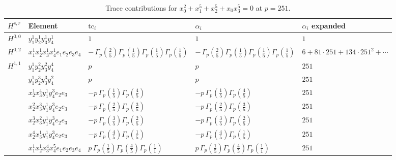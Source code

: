 \documentclass[11pt]{article}
\begin{document}
\begin{table}[ht]
\centering
\caption{Trace contributions for $x_0^{2} + x_1^{5} + x_2^{5} + x_0 x_3^{5} = 0$ at $p=251$.}\label{tab:deformed-19}
\renewcommand{\arraystretch}{1.1}
{\scriptsize
\begin{tabular}{@{}lllll@{}}
\toprule
$H^{s,r}$ & Element & $\mathrm{tc}_i$ & $\alpha_i$ & $\alpha_i$ expanded \\
\midrule
$H^{0,0}$ & $y_{1}^{1} y_{2}^{1} y_{3}^{1} y_{4}^{1}$ & $1$ & $1$ & $1$ \\
\midrule
$H^{0,2}$ & $x_{1}^{1} x_{2}^{1} x_{3}^{1} x_{4}^{1}  e_{1} e_{2} e_{3} e_{4}$ & $- \, \Gamma_p \left( \frac{2}{5} \right) \Gamma_p \left( \frac{1}{5} \right) \Gamma_p \left( \frac{1}{5} \right) \Gamma_p \left( \frac{1}{5} \right)$ & $- \, \Gamma_p \left( \frac{2}{5} \right) \Gamma_p \left( \frac{1}{5} \right) \Gamma_p \left( \frac{1}{5} \right) \Gamma_p \left( \frac{1}{5} \right)$ & $6{+}81{\cdot}251{+}134{\cdot}251^{2}{+}\cdots$ \\
\midrule
$H^{1,1}$ & $y_{1}^{1} y_{2}^{2} y_{3}^{2} y_{4}^{4}$ & $p \,$ & $p \,$ & $251$ \\
 & $y_{1}^{1} y_{2}^{3} y_{3}^{3} y_{4}^{2}$ & $p \,$ & $p \,$ & $251$ \\
 & $x_{2}^{1} x_{3}^{4} y_{1}^{1} y_{4}^{3} e_{2} e_{3}$ & $- p \, \Gamma_p \left( \frac{1}{5} \right) \Gamma_p \left( \frac{4}{5} \right)$ & $- p \, \Gamma_p \left( \frac{1}{5} \right) \Gamma_p \left( \frac{4}{5} \right)$ & $251$ \\
 & $x_{2}^{2} x_{3}^{3} y_{1}^{1} y_{4}^{3} e_{2} e_{3}$ & $- p \, \Gamma_p \left( \frac{2}{5} \right) \Gamma_p \left( \frac{3}{5} \right)$ & $- p \, \Gamma_p \left( \frac{2}{5} \right) \Gamma_p \left( \frac{3}{5} \right)$ & $251$ \\
 & $x_{2}^{3} x_{3}^{2} y_{1}^{1} y_{4}^{3} e_{2} e_{3}$ & $- p \, \Gamma_p \left( \frac{3}{5} \right) \Gamma_p \left( \frac{2}{5} \right)$ & $- p \, \Gamma_p \left( \frac{3}{5} \right) \Gamma_p \left( \frac{2}{5} \right)$ & $251$ \\
 & $x_{2}^{4} x_{3}^{1} y_{1}^{1} y_{4}^{3} e_{2} e_{3}$ & $- p \, \Gamma_p \left( \frac{4}{5} \right) \Gamma_p \left( \frac{1}{5} \right)$ & $- p \, \Gamma_p \left( \frac{4}{5} \right) \Gamma_p \left( \frac{1}{5} \right)$ & $251$ \\
 & $x_{1}^{1} x_{2}^{1} x_{3}^{4} x_{4}^{5}  e_{1} e_{2} e_{3} e_{4}$ & $p \, \Gamma_p \left( \frac{1}{5} \right) \Gamma_p \left( \frac{4}{5} \right) \Gamma_p \left( \frac{1}{1} \right)$ & $p \, \Gamma_p \left( \frac{1}{5} \right) \Gamma_p \left( \frac{4}{5} \right) \Gamma_p \left( \frac{1}{1} \right)$ & $251$ \\

\end{tabular}}
\end{table}
\end{document}
